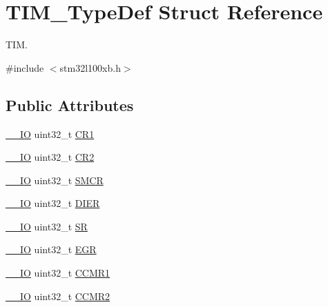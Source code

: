 \hypertarget{struct_t_i_m___type_def}{\section{T\-I\-M\-\_\-\-Type\-Def Struct Reference}
\label{struct_t_i_m___type_def}
}


T\-I\-M.  




{\ttfamily \#include $<$stm32l100xb.\-h$>$}

\subsection*{Public Attributes}
\begin{DoxyCompactItemize}
\item 
\hyperlink{core__sc300_8h_aec43007d9998a0a0e01faede4133d6be}{\-\_\-\-\_\-\-I\-O} uint32\-\_\-t \hyperlink{struct_t_i_m___type_def_a9dafc8b03e8497203a8bb395db865328}{C\-R1}
\item 
\hyperlink{core__sc300_8h_aec43007d9998a0a0e01faede4133d6be}{\-\_\-\-\_\-\-I\-O} uint32\-\_\-t \hyperlink{struct_t_i_m___type_def_a6b1ae85138ed91686bf63699c61ef835}{C\-R2}
\item 
\hyperlink{core__sc300_8h_aec43007d9998a0a0e01faede4133d6be}{\-\_\-\-\_\-\-I\-O} uint32\-\_\-t \hyperlink{struct_t_i_m___type_def_a67d30593bcb68b98186ebe5bc8dc34b1}{S\-M\-C\-R}
\item 
\hyperlink{core__sc300_8h_aec43007d9998a0a0e01faede4133d6be}{\-\_\-\-\_\-\-I\-O} uint32\-\_\-t \hyperlink{struct_t_i_m___type_def_a22a33c78ca5bec0e3e8559164a82b8ef}{D\-I\-E\-R}
\item 
\hyperlink{core__sc300_8h_aec43007d9998a0a0e01faede4133d6be}{\-\_\-\-\_\-\-I\-O} uint32\-\_\-t \hyperlink{struct_t_i_m___type_def_acedfc978c879835c05ef1788ad26b2ff}{S\-R}
\item 
\hyperlink{core__sc300_8h_aec43007d9998a0a0e01faede4133d6be}{\-\_\-\-\_\-\-I\-O} uint32\-\_\-t \hyperlink{struct_t_i_m___type_def_a04248d87f48303fd2267810104a7878d}{E\-G\-R}
\item 
\hyperlink{core__sc300_8h_aec43007d9998a0a0e01faede4133d6be}{\-\_\-\-\_\-\-I\-O} uint32\-\_\-t \hyperlink{struct_t_i_m___type_def_a0f2291e7efdf3222689ef13e9be2ea4a}{C\-C\-M\-R1}
\item 
\hyperlink{core__sc300_8h_aec43007d9998a0a0e01faede4133d6be}{\-\_\-\-\_\-\-I\-O} uint32\-\_\-t \hyperlink{struct_t_i_m___type_def_aa8129ca70a2232c91c8cfcaf375249f6}{C\-C\-M\-R2}
\item 

\end{DoxyCompactItemize}
